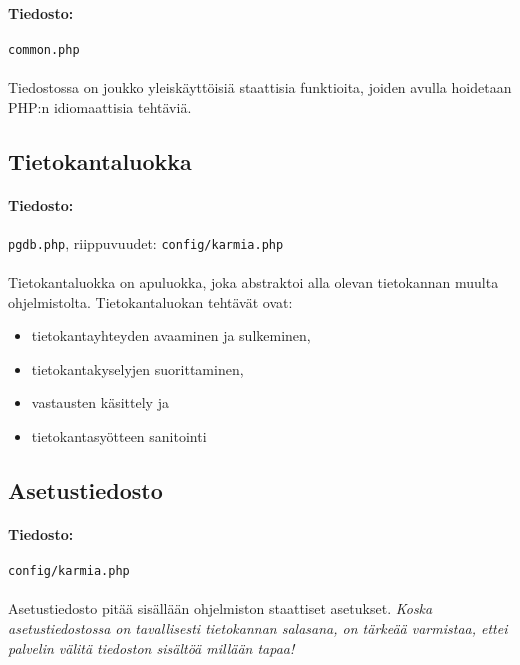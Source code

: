 \documentclass[11pt]{article}
\begin{document}
\paragraph{Tiedosto:} \large{\texttt{common.php}}

\paragraph{} Tiedostossa on joukko yleiskäyttöisiä staattisia funktioita, joiden avulla hoidetaan PHP:n idiomaattisia tehtäviä.


\subsection{Tietokantaluokka}

\paragraph{Tiedosto:} \large{\texttt{pgdb.php}}, riippuvuudet: \texttt{config/karmia.php}

\paragraph{} Tietokantaluokka on apuluokka, joka abstraktoi alla olevan tietokannan muulta ohjelmistolta. Tietokantaluokan tehtävät ovat:
\begin{itemize}
\item tietokantayhteyden avaaminen ja sulkeminen,
\item tietokantakyselyjen suorittaminen,
\item vastausten käsittely ja
\item tietokantasyötteen sanitointi
\end{itemize}


\subsection{Asetustiedosto}

\paragraph{Tiedosto:} \large{\texttt{config/karmia.php}}

\paragraph{} Asetustiedosto pitää sisällään ohjelmiston staattiset asetukset. \emph{Koska asetustiedostossa on tavallisesti tietokannan salasana, on tärkeää varmistaa, ettei palvelin välitä tiedoston sisältöä millään tapaa!}
\end{document}
